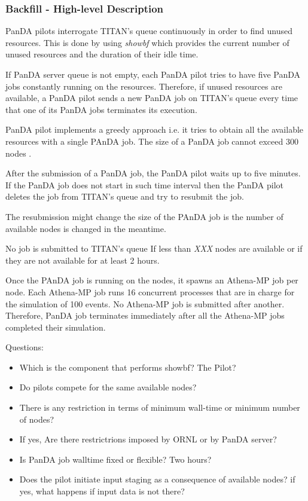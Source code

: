 \subsubsection{Backfill - High-level Description}
PanDA pilots  interrogate TITAN's queue continuously in order to find unused resources. This is done by using \emph{showbf} which provides the current number of unused resources and the duration of their idle time.
  
If PanDA server queue is not empty, each PanDA pilot tries to have five PanDA jobs constantly running on the resources. Therefore, if unused resources are available, a PanDA pilot sends a new PanDA job on TITAN's queue every time that one of its PanDA jobs terminates its execution. 

PanDA pilot implements a greedy approach i.e. it tries to obtain all the available resources with a single PAnDA job. The size of a PanDA job cannot exceed 300 nodes . 

After the submission of a PanDA job,  the PanDA pilot waits up to five minutes. If the PanDA job does not start in such time interval then the PanDA pilot deletes the job from TITAN's queue and try to resubmit the job. 

The resubmission might change the size of the PAnDA job is the number of available nodes is changed in the meantime.

No job is submitted to TITAN's queue If less than \emph{XXX} nodes are available or if they are not  available for at least 2 hours.

Once the PAnDA job is running on the nodes, it spawns an Athena-MP job per node. Each Athena-MP job runs 16 concurrent processes that are in charge for the simulation of 100 events. No Athena-MP job is submitted after another. Therefore, PanDA job terminates immediately after all the Athena-MP jobs completed their simulation.



Questions:
\begin{itemize}
\item Which is the component that performs showbf? The Pilot?
\item Do pilots compete for the same available nodes?
\item There is any restriction in terms of minimum wall-time or minimum number of nodes?
\item If yes, Are there restrictrions imposed by ORNL or by PanDA server?
\item Is PanDA job walltime fixed or flexible? Two hours?
\item Does the pilot initiate input staging as a consequence of available nodes? if yes, what happens if input data is not there? 
\end{itemize}


